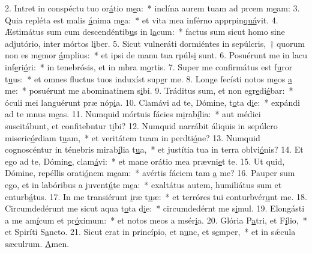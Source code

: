 2. Intret in conspéctu tuo or\uline{á}tio m\uline{e}a:~* inclína aurem tuam ad prcem m\uline{e}am:
3. Quia repléta est malis \uline{á}nima m\uline{e}a:~* et vita mea inférno apprpin\uline{quá}vit.
4. Æstimátus sum cum descendéntib\uline{u}s in l\uline{a}cum:~* factus sum sicut homo sine adjutório, inter mórtos l\uline{i}ber.
5. Sicut vulneráti dormiéntes in sepúlcris,~† quorum non es m\uline{e}mor \uline{á}mplius:~* et ipsi de manu tua rpúls\uline{i} sunt.
6. Posuérunt me in lacu inf\uline{e}ri\uline{ó}ri:~* in tenebrósis, et in mbra m\uline{o}rtis.
7. Super me confirmátus est f\uline{u}ror t\uline{u}us:~* et omnes fluctus tuos induxíst sup\uline{e}r me.
8. Longe fecísti notos m\uline{e}os \uline{a} me:~* posuérunt me abominatinem s\uline{i}bi.
9. Tráditus sum, et non egr\uline{e}di\uline{é}bar:~* óculi mei languérunt præ nóp\uline{i}a.
10. Clamávi ad te, Dómine, t\uline{o}ta d\uline{i}e:~* expándi ad te mnus m\uline{e}as.
11. Numquid mórtuis fácies m\uline{i}rab\uline{í}lia:~* aut médici suscitábunt, et confitebntur t\uline{i}bi?
12. Numquid narrábit áliquis in sepúlcro miseric\uline{ó}rdiam t\uline{u}am,~* et veritátem tuam in perdti\uline{ó}ne?
13. Numquid cognoscéntur in ténebris mirab\uline{í}lia t\uline{u}a,~* et justítia tua in terra oblvi\uline{ó}nis?
14. Et ego ad te, Dómin\uline{e}, clam\uline{á}vi:~* et mane orátio mea prævni\uline{e}t te.
15. Ut quid, Dómine, repéllis orati\uline{ó}nem m\uline{e}am:~* avértis fáciem tam \uline{a} me?
16. Pauper sum ego, et in labóribus a juvent\uline{ú}te m\uline{e}a:~* exaltátus autem, humiliátus sum et cnturb\uline{á}tus.
17. In me transiérunt \uline{i}ræ t\uline{u}æ:~* et terróres tui conturbvér\uline{u}nt me.
18. Circumdedérunt me sicut aqua t\uline{o}ta d\uline{i}e:~* circumdedérnt me s\uline{i}mul.
19. Elongásti a me am\uline{í}cum et pr\uline{ó}ximum:~* et notos meos a msér\uline{i}a.
20. Glória P\uline{a}tri, et F\uline{í}lio,~* et Spiríti S\uline{a}ncto.
21. Sicut erat in princípio, et n\uline{u}nc, et s\uline{e}mper,~* et in sǽcula sæculrum. \uline{A}men.
